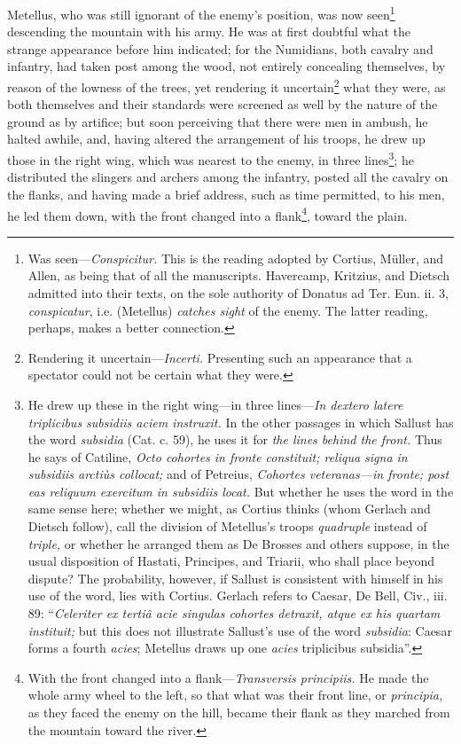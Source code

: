 Metellus, who was still ignorant of the enemy's position, was now
seen\footnote{Was seen—\emph{Conspicitur.} This is the reading adopted by Cortius,
Müller, and Allen, as being that of all the manuscripts. Havercamp,
Kritzius, and Dietsch admitted into their texts, on the sole authority
of Donatus ad Ter. Eun. ii. 3, \emph{conspicatur}, i.e. (Metellus) \emph{catches
sight} of the enemy. The latter reading, perhaps, makes a better
connection.} descending the mountain with his army. He was at first
doubtful what the strange appearance before him indicated; for the
Numidians, both cavalry and infantry, had taken post among the wood,
not entirely concealing themselves, by reason of the lowness of the
trees, yet rendering it uncertain\footnote{Rendering it uncertain—\emph{Incerti.} Presenting such an
appearance that a spectator could not be certain what they were.} what they were, as both
themselves and their standards were screened as well by the nature of
the ground as by artifice; but soon perceiving that there were men in
ambush, he halted awhile, and, having altered the arrangement of his
troops, he drew up those in the right wing, which was nearest to the
enemy, in three lines\footnote{He drew up these in the right wing—in three lines—\emph{In
dextero latere triplicibus subsidiis aciem instruxit.} In the other
passages in which Sallust has the word \emph{subsidia} (Cat. c. 59), he
uses it for \emph{the lines behind the front.} Thus he says of Catiline,
\emph{Octo cohortes in fronte constituit; reliqua signa in subsidiis
arctiùs collocat;} and of Petreius, \emph{Cohortes veteranas—in fronte;
post eas reliquum exercitum in subsidiis locat.} But whether he uses
the word in the same sense here; whether we might, as Cortius thinks
(whom Gerlach and Dietsch follow), call the division of Metellus's
troops \emph{quadruple} instead of \emph{triple,} or whether he arranged them as
De Brosses and others suppose, in the usual disposition of Hastati,
Principes, and Triarii, who shall place beyond dispute? The probability,
however, if Sallust is consistent with himself in his use of the word,
lies with Cortius. Gerlach refers to Caesar, De Bell, Civ., iii. 89:
``\emph{Celeriter ex tertiâ acie singulas cohortes detraxit, atque ex his
quartam instituit;} but this does not illustrate Sallust's use of the
word \emph{subsidia}: Caesar forms a fourth \emph{acies}; Metellus draws up one
\emph{acies} triplicibus subsidia''.}; he distributed the slingers and archers
among the infantry, posted all the cavalry on the flanks, and having
made a brief address, such as time permitted, to his men, he led them
down, with the front changed into a flank\footnote{With the front changed into a flank—\emph{Transversis principiis.}
He made the whole army wheel to the left, so that what was their front
line, or \emph{principia,} as they faced the enemy on the hill, became their
flank as they marched from the mountain toward the river.}, toward the plain.

